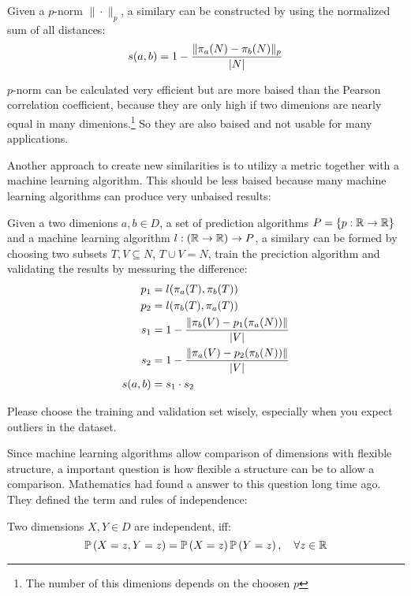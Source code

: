 \begin{envtheo}
	Given a $p$-norm $\|\cdot\|_p$, a similary can be constructed by using the normalized sum of all distances:
	\begin{equation}
		s(a,b) = 1 - \frac{\|\pi_a(N) - \pi_b(N)\|_p}{\left|N\right|}
	\end{equation}
\end{envtheo}

$p$-norm can be calculated very efficient but are more baised than the Pearson correlation coefficient, because they are only high if two dimenions are nearly equal in many dimenions.\footnote{The number of this dimenions depends on the choosen $p$} So they are also baised and not usable for many applications.

Another approach to create new similarities is to utilizy a metric together with a machine learning algorithm. This should be less baised because many machine learning algorithms can produce very unbaised results:

\begin{envtheo}
	Given a two dimenions $a,b \in D$, a set of prediction algorithms $P = \{ p : \mathbb{R} \rightarrow \mathbb{R} \}$ and a machine learning algorithm $l : (\mathbb{R} \rightarrow \mathbb{R}) \rightarrow P$, a similary can be formed by choosing two subsets $T,V \subseteq N$, $T \cup V = N$, train the preciction algorithm and validating the results by messuring the difference:
	\begin{align}
		p_1 &= l( \pi_a(T), \pi_b(T) )\\
		p_2 &= l( \pi_b(T), \pi_a(T) )\\
		s_1 &= 1 - \frac{\|\pi_b(V) - p_1(\pi_a(N))\|}{\left|V\right|}\\
		s_2 &= 1 - \frac{\|\pi_a(V) - p_2(\pi_b(N))\|}{\left|V\right|}\\
		s(a,b) &= s_1 \cdot s_2
	\end{align}
\end{envtheo}

Please choose the training and validation set wisely, especially when you expect outliers in the dataset.

Since machine learning algorithms allow comparison of dimensions with flexible structure, a important question is how flexible a structure can be to allow a comparison. Mathematics had found a answer to this question long time ago. They defined the term and rules of independence:

\begin{envdef}[Independence]
	Two dimensions $X,Y \in D$ are independent, iff:
	\begin{equation}
		\mathbb{P}\left(X=z,Y=z\right) = \mathbb{P}\left(X=z\right)\mathbb{P}\left(Y=z\right),\quad \forall z \in \mathbb{R}
	\end{equation}
\end{envdef}

